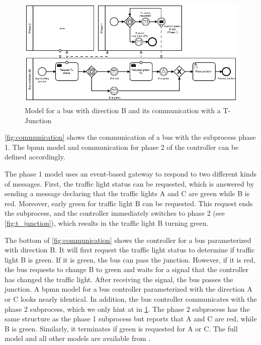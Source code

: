 \documentclass{jot}
\begin{document}
\begin{figure}[ht]
    \centering
    \includegraphics[width=1\textwidth]{figures/communication.pdf}
    \caption{Model for a bus with direction B and its communication with a T-Junction}
    \label{fig:communication}
\end{figure}

\autoref{fig:communication} shows the communication of a bus with the subprocess phase 1.
The \gls*{bpmn} model and communication for phase 2 of the controller can be defined accordingly.

The phase 1 model uses an event-based gateway to respond to two different kinds of messages.
First, the traffic light status can be requested, which is answered by sending a message declaring that the traffic lights A and C are green while B is red.
Moreover, early green for traffic light B can be requested.
This request ends the subprocess, and the controller immediately switches to phase 2 (see \cref{fig:t_junction}), which results in the traffic light B turning green.

The bottom of \autoref{fig:communication} shows the controller for a bus parameterized with direction B.
It will first request the traffic light status to determine if traffic light B is green.
If it is green, the bus can pass the junction.
However, if it is red, the bus requests to change B to green and waits for a signal that the controller has changed the traffic light.
After receiving the signal, the bus passes the junction.
A \gls*{bpmn} model for a bus controller parameterized with the direction A or C looks nearly identical.
In addition, the bus controller communicates with the phase 2 subprocess, which we only hint at in \cref{fig:communication}.
The phase 2 subprocess has the same structure as the phase 1 subprocess but reports that A and C are red, while B is green.
Similarly, it terminates if green is requested for A or C.
The full model and all other models are available from \cite{krauterArtifactsBehavioralConsistency2022}.
\end{document}
